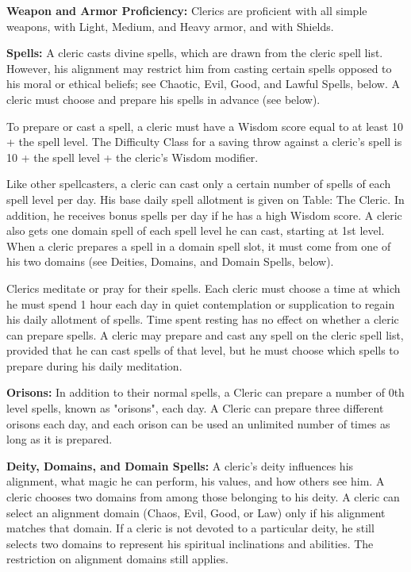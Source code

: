 \classfeatures

\textbf{Weapon and Armor Proficiency:} Clerics are proficient with all simple weapons, with Light, Medium, and Heavy armor, and with Shields.

\textbf{Spells:} A cleric casts divine spells, which are drawn from the cleric spell list. However, his alignment may restrict him from casting certain spells opposed to his moral or ethical beliefs; see Chaotic, Evil, Good, and Lawful Spells, below. A cleric must choose and prepare his spells in advance (see below).

To prepare or cast a spell, a cleric must have a Wisdom score equal to at least 10 + the spell level. The Difficulty Class for a saving throw against a cleric's spell is 10 + the spell level + the cleric's Wisdom modifier.

Like other spellcasters, a cleric can cast only a certain number of spells of each spell level per day. His base daily spell allotment is given on Table: The Cleric. In addition, he receives bonus spells per day if he has a high Wisdom score. A cleric also gets one domain spell of each spell level he can cast, starting at 1st level. When a cleric prepares a spell in a domain spell slot, it must come from one of his two domains (see Deities, Domains, and Domain Spells, below).

Clerics meditate or pray for their spells. Each cleric must choose a time at which he must spend 1 hour each day in quiet contemplation or supplication to regain his daily allotment of spells. Time spent resting has no effect on whether a cleric can prepare spells. A cleric may prepare and cast any spell on the cleric spell list, provided that he can cast spells of that level, but he must choose which spells to prepare during his daily meditation.

\textbf{Orisons:} In addition to their normal spells, a Cleric can prepare a number of 0th level spells, known as "orisons", each day. A Cleric can prepare three different orisons each day, and each orison can be used an unlimited number of times as long as it is prepared.

\textbf{Deity, Domains, and Domain Spells:} A cleric's deity influences his alignment, what magic he can perform, his values, and how others see him. A cleric chooses two domains from among those belonging to his deity. A cleric can select an alignment domain (Chaos, Evil, Good, or Law) only if his alignment matches that domain. If a cleric is not devoted to a particular deity, he still selects two domains to represent his spiritual inclinations and abilities. The restriction on alignment domains still applies.

